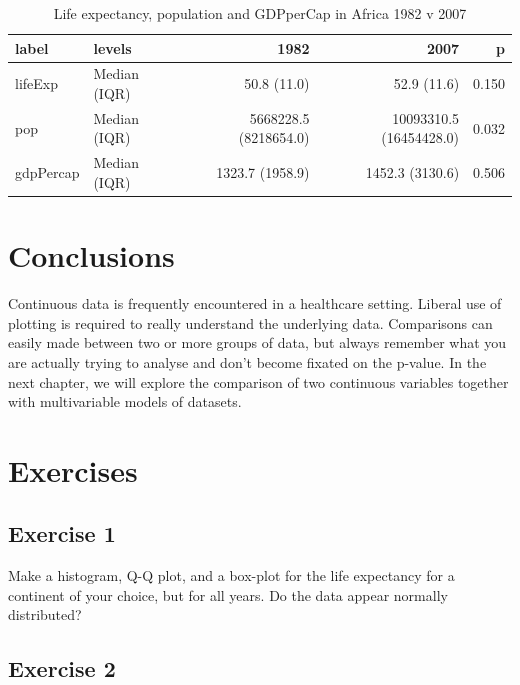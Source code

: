\documentclass[12pt,]{krantz}
\theoremstyle{definition}
\theoremstyle{definition}
\theoremstyle{definition}
\theoremstyle{remark}
\begin{document}
\begin{table}[t]

\caption{\label{tab:unnamed-chunk-27}Life expectancy, population and GDPperCap in Africa 1982 v 2007}
\centering
\begin{tabular}{llrrr}
\toprule
label & levels & 1982 & 2007 & p\\
\midrule
lifeExp & Median (IQR) & 50.8 (11.0) & 52.9 (11.6) & 0.150\\
pop & Median (IQR) & 5668228.5 (8218654.0) & 10093310.5 (16454428.0) & 0.032\\
gdpPercap & Median (IQR) & 1323.7 (1958.9) & 1452.3 (3130.6) & 0.506\\
\bottomrule
\end{tabular}
\end{table}

 

\hypertarget{conclusions}{%
\section{Conclusions}\label{conclusions}}

Continuous data is frequently encountered in a healthcare setting.
Liberal use of plotting is required to really understand the underlying
data. Comparisons can easily made between two or more groups of data,
but always remember what you are actually trying to analyse and don't
become fixated on the p-value. In the next chapter, we will explore the
comparison of two continuous variables together with multivariable
models of datasets.

\hypertarget{exercises}{%
\section{Exercises}\label{exercises}}

\hypertarget{exercise-1-1}{%
\subsection{Exercise 1}\label{exercise-1-1}}

Make a histogram, Q-Q plot, and a box-plot for the life expectancy for a
continent of your choice, but for all years. Do the data appear normally
distributed?

\hypertarget{exercise-2-1}{%
\subsection{Exercise 2}\label{exercise-2-1}}
\end{document}
